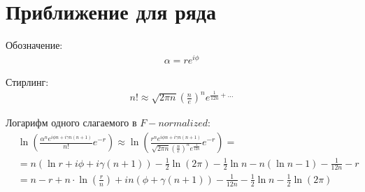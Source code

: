 \documentclass[a4paper, 12pt]{article}
\author{Нугманов Булат}
\begin{document}
\section*{Приближение для ряда}
Обозначение:
\begin{equation}
    \begin{aligned}
        \alpha = r e^{i\phi}
    \end{aligned}
\end{equation}

Стирлинг:
\begin{equation}
    \begin{aligned}
        n! \approx \sqrt{2\pi n} \left(\frac{n}{e}\right)^n e^{\frac{1}{12n}+\dots}
    \end{aligned}
\end{equation}

Логарифм одного слагаемого в $F-normalized$:
\begin{equation}
\begin{aligned}
    &\ln\left(\frac{\alpha^n e^{i\phi n + i\gamma n(n+1)}}{n!}e^{-r}\right)  \approx 
    \ln\left(\frac{r^n e^{i\phi n + i\gamma n(n+1)}}{\sqrt{2\pi n} \left(\frac{n}{e}\right)^n e^{\frac{1}{12n}}}e^{-r}\right) =\\
    &=n \left(\ln r + i \phi + i \gamma (n+1)\right) - \frac{1}{2}\ln\left(2\pi\right) 
    - \frac{1}{2}\ln n - n \left(\ln n - 1\right) - \frac{1}{12n} - r\\
    &=n-r + n\cdot\ln\left(\frac{r}{n}\right) + i n \left(\phi + \gamma(n+1)\right)
     -  \frac{1}{12n} - \frac{1}{2}\ln n - \frac{1}{2}\ln\left(2\pi\right) 
\end{aligned}
\end{equation}
\end{document}
